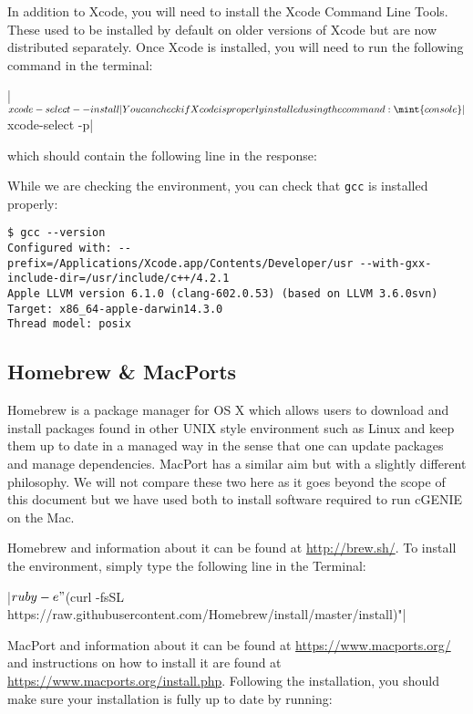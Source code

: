 \documentclass{scrartcl}
\begin{document}
In addition to Xcode, you will need to install the Xcode Command Line Tools.
These used to be installed by default on older versions of Xcode but are now
distributed separately. Once Xcode is installed, you will need to run the
following command in the terminal:

|$ xcode-select --install| %

You can check if Xcode is properly installed using the command:

\mint{console}|$ xcode-select -p| %

which should contain the following line in the response:


While we are checking the environment, you can check that \texttt{gcc} is installed properly:

\begin{verbatim}
$ gcc --version
Configured with: --prefix=/Applications/Xcode.app/Contents/Developer/usr --with-gxx-include-dir=/usr/include/c++/4.2.1
Apple LLVM version 6.1.0 (clang-602.0.53) (based on LLVM 3.6.0svn)
Target: x86_64-apple-darwin14.3.0
Thread model: posix
\end{verbatim}

\subsection{Homebrew \& MacPorts}

Homebrew is a package manager for OS X which allows users to download and
install packages found in other UNIX style environment such as Linux and keep
them up to date in a managed way in the sense that one can update packages and
manage dependencies. MacPort has a similar aim but with a slightly different
philosophy. We will not compare these two here as it goes beyond the scope of
this document but we have used both to install software required to run cGENIE
on the Mac.

Homebrew and information about it can be found at \url{http://brew.sh/}. To
install the environment, simply type the following line in the Terminal:

|$ ruby -e "$(curl -fsSL https://raw.githubusercontent.com/Homebrew/install/master/install)"| %

MacPort and information about it can be found at
\url{https://www.macports.org/} and instructions on how to install it are found
at \url{https://www.macports.org/install.php}. Following the installation, you
should make sure your installation is fully up to date by running:
\end{document}
